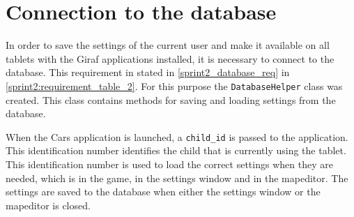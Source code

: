 \section{Connection to the database}
\label{sprint3:database}
In order to save the settings of the current user and make it available on all tablets with the Giraf applications installed, it is necessary to connect to the database.
This requirement in stated in \cref{sprint2_database_req} in \cref{sprint2:requirement_table_2}.
For this purpose the \lstinline!DatabaseHelper! class was created.
This class contains methods for saving and loading settings from the database. 

When the Cars application is launched, a \lstinline!child_id! is passed to the application. 
This identification number identifies the child that is currently using the tablet.
This identification number is used to load the correct settings when they are needed, which is in the game, in the settings window and in the mapeditor.
The settings are saved to the database when either the settings window or the mapeditor is closed.